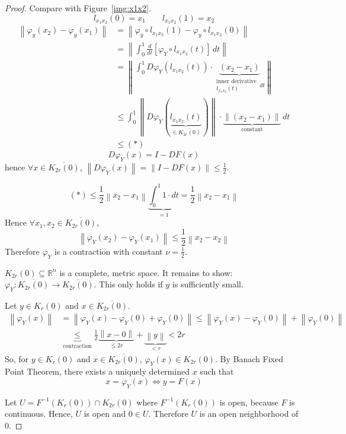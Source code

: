\documentclass{article}
\newcommand{\norm}[1]{\left\|#1\right\|}
\begin{document}
\begin{proof}
  Compare with Figure~\ref{img:x1x2}.
  \[ l_{x_1 x_2}(0) = x_1 \qquad l_{x_1 x_2}(1) = x_2 \]
  \begin{align*}
	\norm{\varphi_y(x_2) - \varphi_y(x_1)}
	  &= \norm{\varphi_y \circ l_{x_1 x_2}(1) - \varphi_y \circ l_{x_1 x_2}(0)} \\
	  &= \norm{\int_0^1 \frac{d}{dt} [\varphi_Y \circ l_{x_1 x_2}(t)] \, dt} \\
	  &= \norm{\int_0^1 D\varphi_Y(l_{x_1 x_2}(t)) \cdot \underbrace{\left(x_2 - x_1\right)}_{\substack{\text{inner derivative} \\ l_{x_1 x_2}(t)} \, dt}} \\
	  &\leq \int_0^1 \norm{D\varphi_Y(\underbrace{l_{x_1 x_2}(t)}_{\in \overline{K_{2r}(0)}})} \cdot \underbrace{\norm{(x_2 - x_1)}}_{\text{constant}} \, dt \\
	  &\leq (*)
  \end{align*}
  \[ D \varphi_Y(x) = I - DF(x) \]
  hence $\forall x \in \overline{K_{2r}(0)}$, $\norm{D\varphi_Y(x)} = \norm{I - DF(x)} \leq \frac12$.

  \[ (*) \leq \frac12 \norm{x_2 - x_1} \underbrace{\int_0^1 1 \cdot dt}_{= 1} = \frac12 \norm{x_2 - x_1} \]
  Hence $\forall x_1, x_2 \in \overline{K_{2r}(0)}$,
  \[ \norm{\varphi_Y(x_2) - \varphi_Y(x_1)} \leq \frac12 \norm{x_2 - x_2} \]
  Therefore $\varphi_Y$ is a contraction with constant $\nu = \frac12$.

  $K_{2r}(0) \subseteq \mathbb R^n$ is a complete, metric space. It remains to show: $\varphi_Y: \overline{K_{2r}(0)} \to \overline{K_{2r}(0)}$.
  This only holds if $y$ is sufficiently small.
  
  Let $y \in K_r(0)$ and $x \in \overline{K_{2r}(0)}$.
  \begin{align*}
    \norm{\varphi_Y(x)} &= \norm{\varphi_Y(x) - \varphi_Y(0) + \varphi_Y(0)} \leq \norm{\varphi_Y(x) - \varphi_Y(0)} + \norm{\varphi_Y(0)} \\
                        &\underbrace{\leq}_{\text{contraction}} \frac12 \underbrace{\norm{x - 0}}_{\leq 2r} + \underbrace{\norm{y}}_{< r} < 2r
  \end{align*}
  So, for $y \in K_r(0)$ and $x \in \overline{K_{2r}(0)}$, $\varphi_Y(x) \in K_{2r}(0)$.
  By Banach Fixed Point Theorem, there exists a uniquely determined $x$ such that
  \[ x = \varphi_Y(x) \iff y = F(x) \]
  
  Let $U = F^{-1}(K_r(0)) \cap K_{2r}(0)$ where $F^{-1}(K_r(0))$ is open, because $F$ is continuous.
  Hence, $U$ is open and $0 \in U$. Therefore $U$ is an open neighborhood of $0$.


\end{proof}
\end{document}
